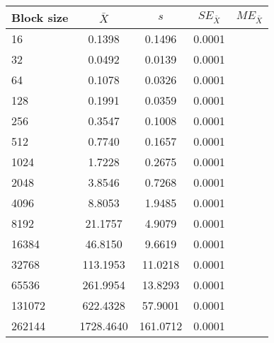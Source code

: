 \begin{tabular}{lcccc}\toprule
{\small Block size} & $\bar{X}$ & $s$ & $SE_{\bar{X}}$ & $ME_{\bar{X}}$ \\\midrule
16 & 0.1398 & 0.1496 &  0.0001\\
32 & 0.0492 & 0.0139 &  0.0001\\
64 & 0.1078 & 0.0326 &  0.0001\\
128 & 0.1991 & 0.0359 &  0.0001\\
256 & 0.3547 & 0.1008 &  0.0001\\
512 & 0.7740 & 0.1657 &  0.0001\\
1024 & 1.7228 & 0.2675 &  0.0001\\
2048 & 3.8546 & 0.7268 &  0.0001\\
4096 & 8.8053 & 1.9485 &  0.0001\\
8192 & 21.1757 & 4.9079 &  0.0001\\
16384 & 46.8150 & 9.6619 &  0.0001\\
32768 & 113.1953 & 11.0218 &  0.0001\\
65536 & 261.9954 & 13.8293 &  0.0001\\
131072 & 622.4328 & 57.9001 &  0.0001\\
262144 & 1728.4640 & 161.0712 &  0.0001\\
\bottomrule
\end{tabular}
